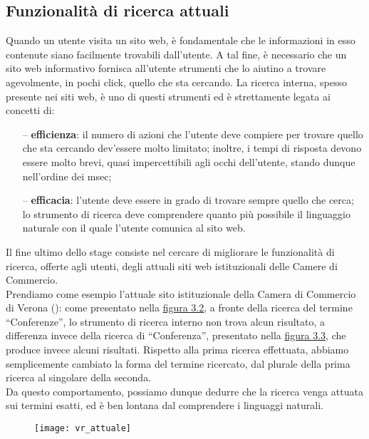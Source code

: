		\subsection{Funzionalità di ricerca attuali}
		Quando un utente visita un sito web, è fondamentale che le informazioni in esso contenute siano facilmente trovabili dall'utente.
		A tal fine, è necessario che un sito web informativo fornisca all'utente strumenti che lo aiutino a trovare agevolmente, in pochi click, quello che sta cercando. La ricerca interna, spesso presente nei siti web, è uno di questi strumenti ed è strettamente legata ai concetti di:
		\begin{itemize}
			\item[--]{\textbf{efficienza}: il numero di azioni che l'utente deve compiere per trovare quello che sta cercando dev'essere molto limitato; inoltre, i tempi di risposta devono essere molto brevi, quasi impercettibili agli occhi dell'utente, stando dunque nell’ordine dei msec;}
			\item[--]{\textbf{efficacia}: l’utente deve essere in grado di trovare sempre quello che cerca; lo strumento di ricerca deve comprendere quanto più possibile il linguaggio naturale con il quale l'utente comunica al sito web.}
		\end{itemize}
		
		Il fine ultimo dello stage consiste nel cercare di migliorare le funzionalità di ricerca, offerte agli utenti, degli attuali siti web istituzionali delle Camere di Commercio. \\
		Prendiamo come esempio l’attuale sito istituzionale della Camera di Commercio di Verona (\cite{site:vr_camerale}): come presentato nella \hyperref[img:conferenze]{figura 3.2}, a fronte della ricerca del termine “Conferenze”, lo strumento di ricerca interno non trova alcun risultato, a differenza invece della ricerca di “Conferenza”, presentato nella \hyperref[img:conferenza]{figura 3.3}, che produce invece alcuni risultati. Rispetto alla prima ricerca effettuata, abbiamo semplicemente cambiato la forma del termine ricercato, dal plurale della prima ricerca al singolare della seconda. \\ 
		Da questo comportamento, possiamo dunque dedurre che la ricerca venga attuata sui termini esatti, ed è ben lontana dal comprendere i linguaggi naturali.

		\begin{figure}[htbp]
			\label{img:conferenze}
			\begin{center}
				\texttt{[image: vr\_attuale]}
			\end{center}
		\end{figure}
	
